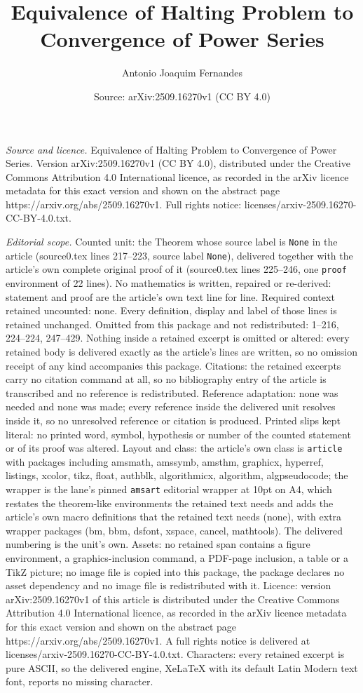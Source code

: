 \documentclass[10pt,a4paper]{amsart}
\title[Equivalence of Halting Problem to Convergence of Power Serie]{Equivalence of Halting Problem to Convergence of Power Series}
\author{Antonio Joaquim Fernandes}
\date{Source: arXiv:2509.16270v1 (CC BY 4.0)}
\begin{document}
\maketitle

\noindent\emph{Source and licence.} Equivalence of Halting Problem to Convergence of Power Series. Version arXiv:2509.16270v1 (CC BY 4.0), distributed under the Creative Commons Attribution 4.0 International licence, as recorded in the arXiv licence metadata for this exact version and shown on the abstract page https://arxiv.org/abs/2509.16270v1. Full rights notice: licenses/arxiv-2509.16270-CC-BY-4.0.txt.\par\smallskip

\noindent\textit{Editorial scope.} Counted unit: the Theorem whose source label is \texttt{None} in the article (source0.tex lines 217--223, source label \texttt{None}), delivered together with the article's own complete original proof of it (source0.tex lines 225--246, one \texttt{proof} environment of 22 lines). No mathematics is written, repaired or re-derived: statement and proof are the article's own text line for line. Required context retained uncounted: none. Every definition, display and label of those lines is retained unchanged. Omitted from this package and not redistributed: 1--216, 224--224, 247--429. Nothing inside a retained excerpt is omitted or altered: every retained body is delivered exactly as the article's lines are written, so no omission receipt of any kind accompanies this package. Citations: the retained excerpts carry no citation command at all, so no bibliography entry of the article is transcribed and no reference is redistributed. Reference adaptation: none was needed and none was made; every reference inside the delivered unit resolves inside it, so no unresolved reference or citation is produced. Printed slips kept literal: no printed word, symbol, hypothesis or number of the counted statement or of its proof was altered. Layout and class: the article's own class is \texttt{article} with packages including amsmath, amssymb, amsthm, graphicx, hyperref, listings, xcolor, tikz, float, authblk, algorithmicx, algorithm, algpseudocode; the wrapper is the lane's pinned \texttt{amsart} editorial wrapper at 10pt on A4, which restates the theorem-like environments the retained text needs and adds the article's own macro definitions that the retained text needs (none), with extra wrapper packages (bm, bbm, dsfont, xspace, cancel, mathtools). The delivered numbering is the unit's own. Assets: no retained span contains a figure environment, a graphics-inclusion command, a PDF-page inclusion, a table or a TikZ picture; no image file is copied into this package, the package declares no asset dependency and no image file is redistributed with it. Licence: version arXiv:2509.16270v1 of this article is distributed under the Creative Commons Attribution 4.0 International licence, as recorded in the arXiv licence metadata for this exact version and shown on the abstract page https://arxiv.org/abs/2509.16270v1. A full rights notice is delivered at licenses/arxiv-2509.16270-CC-BY-4.0.txt. Characters: every retained excerpt is pure ASCII, so the delivered engine, XeLaTeX with its default Latin Modern text font, reports no missing character.
\end{document}
